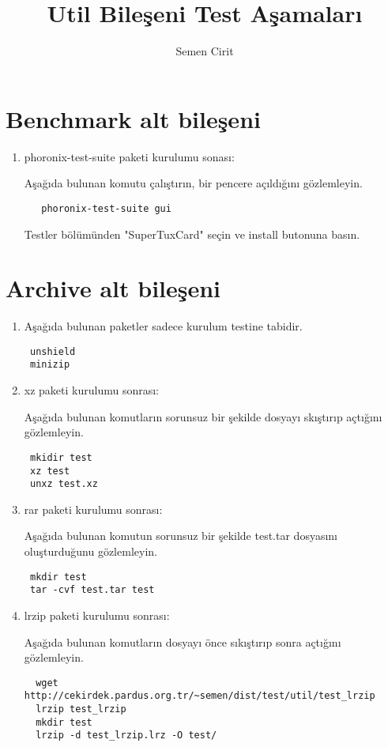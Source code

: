 \documentclass[a4paper,10pt]{article}
\title{Util Bileşeni Test Aşamaları}
\author{Semen Cirit}
\begin{document}
\maketitle
\section{Benchmark alt bileşeni}
\begin{enumerate}
 \item phoronix-test-suite paketi kurulumu sonası:

Aşağıda bulunan komutu çalıştırın, bir pencere açıldığını gözlemleyin.
  \begin{verbatim}
   phoronix-test-suite gui
  \end{verbatim}

Testler bölümünden "SuperTuxCard" seçin ve install butonuna basın. 

\end{enumerate}


\section{Archive alt bileşeni}
\begin{enumerate}
\item Aşağıda bulunan paketler sadece kurulum testine tabidir.
\begin{verbatim}
 unshield
 minizip
\end{verbatim}

\item xz paketi kurulumu sonrası:

Aşağıda bulunan komutların sorunsuz bir şekilde dosyayı skıştırıp açtığını gözlemleyin.
\begin{verbatim}
 mkidir test
 xz test
 unxz test.xz
\end{verbatim}


\item rar paketi kurulumu sonrası:

Aşağıda bulunan komutun sorunsuz bir şekilde test.tar dosyasını oluşturduğunu gözlemleyin.
\begin{verbatim}
 mkdir test
 tar -cvf test.tar test
\end{verbatim}


 \item lrzip paketi kurulumu sonrası:

Aşağıda bulunan komutların dosyayı önce sıkıştırıp sonra açtığını gözlemleyin.
\begin{verbatim}
  wget http://cekirdek.pardus.org.tr/~semen/dist/test/util/test_lrzip
  lrzip test_lrzip
  mkdir test
  lrzip -d test_lrzip.lrz -O test/
\end{verbatim}


\end{enumerate}
\end{document}
